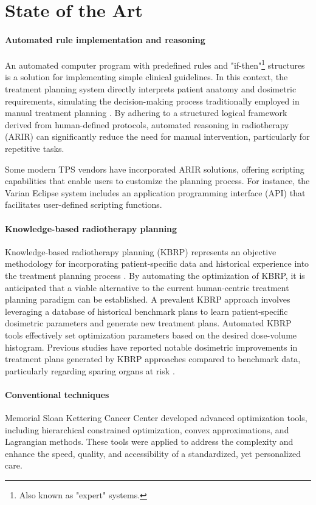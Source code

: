 \section{State of the Art}
\paragraph{Automated rule implementation and reasoning}
An automated computer program with predefined rules and "if-then"\footnote{Also known as "expert" systems.} structures is a solution for implementing simple clinical guidelines.
In this context, the treatment planning system directly interprets patient anatomy and dosimetric requirements, simulating the decision-making process traditionally employed in manual treatment planning \cite{Rossille2005}.
By adhering to a structured logical framework derived from human-defined protocols, automated reasoning in radiotherapy (ARIR) can significantly reduce the need for manual intervention, particularly for repetitive tasks.

Some modern TPS vendors have incorporated ARIR solutions, offering scripting capabilities that enable users to customize the planning process.
For instance, the Varian Eclipse \cite{eclipse} system includes an application programming interface (API) that facilitates user-defined scripting functions.

\paragraph{Knowledge-based radiotherapy planning}
Knowledge-based radiotherapy planning (KBRP) represents an objective methodology for incorporating patient-specific data and historical experience into the treatment planning process \cite{Nwankwo_2014}.
By automating the optimization of KBRP, it is anticipated that a viable alternative to the current human-centric treatment planning paradigm can be established.
A prevalent KBRP approach involves leveraging a database of historical benchmark plans to learn patient-specific dosimetric parameters and generate new treatment plans.
Automated KBRP tools effectively set optimization parameters based on the desired dose-volume histogram.
Previous studies have reported notable dosimetric improvements in treatment plans generated by KBRP approaches compared to benchmark data, particularly regarding sparing organs at risk \cite{Fogliata2014,Tol2015}.

\paragraph{Conventional techniques}
Memorial Sloan Kettering Cancer Center developed advanced optimization tools, including hierarchical constrained optimization, convex approximations, and Lagrangian methods.
These tools were applied to address the complexity and enhance the speed, quality, and accessibility of a standardized, yet personalized care.

